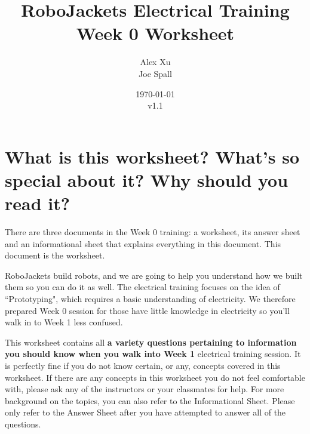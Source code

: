 \documentclass{article}
\title{RoboJackets Electrical Training Week 0 Worksheet}
\author{Alex Xu \\ Joe Spall}
\date{\today\\v1.1}
\begin{document}
\maketitle{}
\setcounter{tocdepth}{2}
\tableofcontents
\pagebreak

\section{What is this worksheet? What's so special about it? Why should you read it?}
There are three documents in the Week 0 training: a worksheet, its answer sheet and an informational sheet that explains everything in this document. This document is the worksheet.
\vspace{6pt}\par
RoboJackets build robots, and we are going to help you understand how we built them so you can do it as well. The electrical training focuses on the idea of ``Prototyping", which requires a basic understanding of electricity. We therefore prepared Week 0 session for those have little knowledge in electricity so you'll walk in to Week 1 less confused. \vspace{6pt}\par
This worksheet contains all \textbf{a variety questions pertaining to information you should know when you walk into Week 1} electrical training session. It is perfectly fine if you do not know certain, or any, concepts covered in this worksheet. If there are any concepts in this worksheet you do not feel comfortable with, please ask any of the instructors or your classmates for help. For more background on the topics, you can also refer to the Informational Sheet. Please only refer to the Answer Sheet after you have attempted to answer all of the questions.\vspace{6pt}\par
\end{document}
